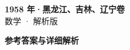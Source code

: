 \documentclass[zihao=-4, a4paper]{ctexart}
\begin{document}
\begin{center}
  {\Large\bfseries 1958 年·黑龙江、吉林、辽宁卷}\\[4pt]
  {\large 数学 · 解析版}
\end{center}
\medskip
{}

\clearpage
{}
\begin{center}{\Large\bfseries 参考答案与详细解析}\end{center}
\medskip

\end{document}
